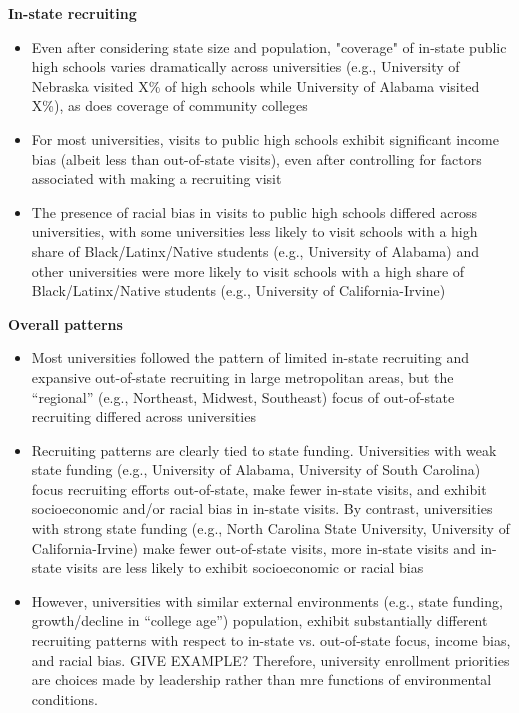 \documentclass[twoside]{article}
\begin{document}
\textbf{In-state recruiting}
\begin{itemize}
    \item Even after considering state size and population, "coverage" of in-state public high schools varies dramatically across universities (e.g., University of Nebraska visited X\% of high schools while University of Alabama visited X\%), as does coverage of community colleges
    \item For most universities, visits to public high schools exhibit significant income bias (albeit less than out-of-state visits), even after controlling for factors associated with making a recruiting visit
    \item The presence of racial bias in visits to public high schools differed across universities, with some universities less likely to visit schools with a high share of Black/Latinx/Native students (e.g., University of Alabama) and other universities were more likely to visit schools with a high share of Black/Latinx/Native students (e.g., University of California-Irvine)
\end{itemize}  

\textbf{Overall patterns}
\begin{itemize}
    \item Most universities followed the pattern of limited in-state recruiting and expansive out-of-state recruiting in large metropolitan areas, but the ``regional'' (e.g., Northeast, Midwest, Southeast) focus of out-of-state recruiting differed across universities
    \item Recruiting patterns are clearly tied to state funding. Universities with weak state funding (e.g., University of Alabama, University of South Carolina) focus recruiting efforts out-of-state, make fewer in-state visits, and exhibit socioeconomic and/or racial bias in in-state visits. By contrast, universities with strong state funding (e.g., North Carolina State University, University of California-Irvine) make fewer out-of-state visits, more in-state visits and in-state visits are less likely to exhibit socioeconomic or racial bias
    \item However, universities with similar external environments (e.g., state funding, growth/decline in ``college age'') population, exhibit substantially different recruiting patterns with respect to in-state vs. out-of-state focus, income bias, and racial bias.  GIVE EXAMPLE? Therefore, university enrollment priorities are choices made by leadership rather than mre functions of environmental conditions.
\end{itemize}  
\end{document}
